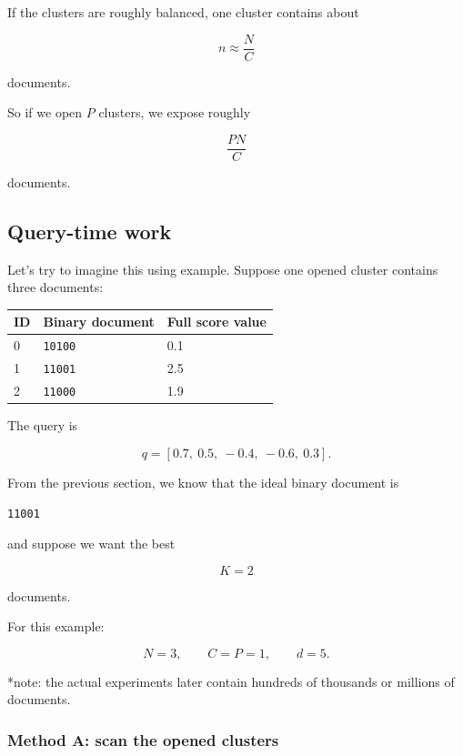 If the clusters are roughly balanced, one cluster contains about

\[
n \approx \frac{N}{C}
\]

documents.

So if we open \(P\) clusters, we expose roughly

\[
\frac{PN}{C}
\]

documents.




\subsection{Query-time work}


Let's try to imagine this using example. Suppose one opened cluster contains three documents:

\begin{center}
\begin{minipage}{\linewidth}
\small
\renewcommand{\arraystretch}{1.2}
\begin{tabular}{@{}p{.16\linewidth}p{.42\linewidth}p{.34\linewidth}@{}}
\toprule
ID & Binary document & Full score value\\
\midrule
0 & \texttt{10100} & 0.1\\
1 & \texttt{11001} & 2.5\\
2 & \texttt{11000} & 1.9\\
\bottomrule
\end{tabular}
\end{minipage}
\end{center}


The query is

\[
q=[0.7,\ 0.5,\ -0.4,\ -0.6,\ 0.3].
\]

From the previous section, we know that the ideal binary document is

\texttt{11001}

and suppose we want the best

\[
K=2
\]

documents.

For this example:

\[
N=3,\qquad C=P=1,\qquad d=5.
\]

*note: the actual experiments later contain hundreds of thousands or millions of documents.



\subsubsection{Method A: scan the opened clusters}


